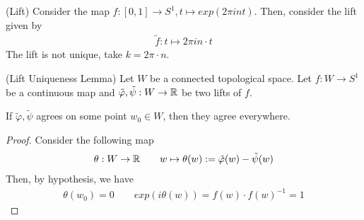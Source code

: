 \documentclass[Total.tex]{subfiles}
\begin{document}
\begin{itemize}
					\begin{example}
						(Lift) Consider the map $f:[0,1]\rightarrow S^1,t\mapsto exp(2\pi int)$. Then, consider the lift given by
						\begin{gather*}
							\tilde{f}:t\mapsto 2\pi in\cdot t
						\end{gather*}
						The lift is not unique, take $k=2\pi\cdot n$.
					\end{example}
					
					\begin{lemma}
						(Lift Uniqueness Lemma) Let $W$ be a connected topological space. Let $f:W\rightarrow S^1$ be a continuous map and $\tilde{\varphi},\tilde{\psi}:W\rightarrow \mathbb{R}$ be two lifts of $f$.
						
						If $\tilde{\varphi},\tilde{\psi}$ agrees on some point $w_0\in W$, then they agree everywhere. 
					\end{lemma}
					\begin{proof}
						Consider the following map
						\begin{gather*}
							\theta:W\rightarrow \mathbb{R}\qquad w\mapsto \theta(w):=\tilde{\varphi}(w)-\tilde{\psi}(w)
						\end{gather*}
						Then, by hypothesis, we have
						\begin{gather*}
							\theta(w_0)=0\qquad exp(i\theta(w))=f(w)\cdot f(w)^{-1}=1
						\end{gather*}
						

\end{proof}
\end{itemize}
\end{document}
